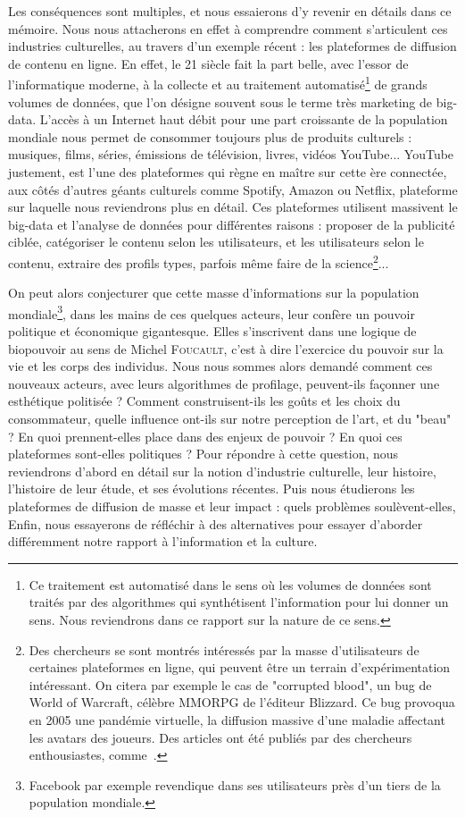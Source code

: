 \documentclass[a4paper,12pt]{report}
\begin{document}
Les conséquences sont multiples, et nous essaierons d'y revenir en détails dans ce mémoire. Nous nous attacherons en effet à comprendre comment s'articulent ces industries culturelles, au travers d'un exemple récent : les plateformes de diffusion de contenu en ligne. En effet, le 21 siècle fait la part belle, avec l'essor de l'informatique moderne, à la collecte et au traitement automatisé\footnote{Ce traitement est automatisé dans le sens où les volumes de données sont traités par des algorithmes qui synthétisent l'information pour lui donner un sens. Nous reviendrons dans ce rapport sur la nature de ce sens.} de grands volumes de données, que l'on désigne souvent sous le terme très marketing de \gls{big-data}. L'accès à un Internet haut débit pour une part croissante de la population mondiale nous permet de consommer toujours plus de produits culturels : musiques, films, séries, émissions de télévision, livres, vidéos YouTube... YouTube justement, est l'une des plateformes qui règne en maître sur cette ère connectée, aux côtés d'autres géants culturels comme Spotify, Amazon ou Netflix, plateforme sur laquelle nous reviendrons plus en détail. Ces plateformes utilisent massivent le \gls{big-data} et l'analyse de données pour différentes raisons : proposer de la publicité ciblée, catégoriser le contenu selon les utilisateurs, et les utilisateurs selon le contenu, extraire des profils types, parfois même faire de la science\footnote{Des chercheurs se sont montrés intéressés par la masse d'utilisateurs de certaines plateformes en ligne, qui peuvent être un terrain d'expérimentation intéressant. On citera par exemple le cas de "corrupted blood", un bug de World of Warcraft, célèbre MMORPG de l'éditeur Blizzard. Ce bug provoqua en 2005 une pandémie virtuelle, la diffusion massive d'une maladie affectant les avatars des joueurs. Des articles ont été publiés par des chercheurs enthousiastes, comme~\cite{wow_pandemic}.}...

On peut alors conjecturer que cette masse d'informations sur la population mondiale\footnote{Facebook par exemple revendique dans ses utilisateurs près d'un tiers de la population mondiale.}, dans les mains de ces quelques acteurs, leur confère un pouvoir politique et économique gigantesque. Elles s'inscrivent dans une logique de biopouvoir au sens de Michel \textsc{Foucault}, c'est à dire l'exercice du pouvoir sur la vie et les corps des individus. Nous nous sommes alors demandé comment ces nouveaux acteurs, avec leurs algorithmes de profilage, peuvent-ils façonner une esthétique politisée ? Comment construisent-ils les goûts et les choix du consommateur, quelle influence ont-ils sur notre perception de l'art, et du "beau" ? En quoi prennent-elles place dans des enjeux de pouvoir ? En quoi ces plateformes sont-elles politiques ? Pour répondre à cette question, nous reviendrons d'abord en détail sur la notion d'industrie culturelle, leur histoire, l'histoire de leur étude, et ses évolutions récentes. Puis nous étudierons les plateformes de diffusion de masse et leur impact : quels problèmes soulèvent-elles,  Enfin, nous essayerons de réfléchir à des alternatives pour essayer d'aborder différemment notre rapport à l'information et la culture.
\end{document}
